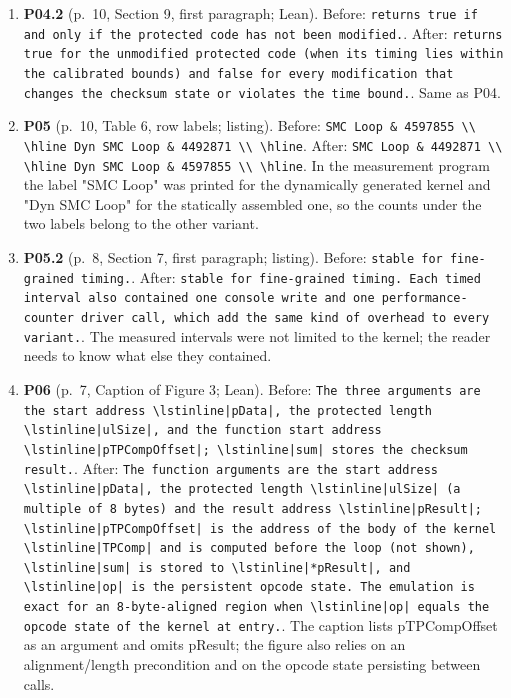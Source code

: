 \documentclass[9pt,twocolumn]{article}
\begin{document}
\begin{enumerate}[label=]
\item \textbf{P04.2} (p.~10, Section 9, first paragraph; Lean). Before: \texttt{returns true if and only if the protected code has not been modified.}. After: \texttt{returns true for the unmodified protected code (when its timing lies within the calibrated bounds) and false for every modification that changes the checksum state or violates the time bound.}. Same as P04. 
\item \textbf{P05} (p.~10, Table 6, row labels; listing). Before: \texttt{SMC Loop \& 4597855 \textbackslash{}\textbackslash{} \textbackslash{}hline Dyn SMC Loop \& 4492871 \textbackslash{}\textbackslash{} \textbackslash{}hline}. After: \texttt{SMC Loop \& 4492871 \textbackslash{}\textbackslash{} \textbackslash{}hline Dyn SMC Loop \& 4597855 \textbackslash{}\textbackslash{} \textbackslash{}hline}. In the measurement program the label "SMC Loop" was printed for the dynamically generated kernel and "Dyn SMC Loop" for the statically assembled one, so the counts under the two labels belong to the other variant. 
\item \textbf{P05.2} (p.~8, Section 7, first paragraph; listing). Before: \texttt{stable for fine-grained timing.}. After: \texttt{stable for fine-grained timing.  Each timed interval also contained one console write and one performance-counter driver call, which add the same kind of overhead to every variant.}. The measured intervals were not limited to the kernel; the reader needs to know what else they contained. 
\item \textbf{P06} (p.~7, Caption of Figure 3; Lean). Before: \texttt{The three arguments are the start address \textbackslash{}lstinline|pData|, the protected length \textbackslash{}lstinline|ulSize|, and the function start address \textbackslash{}lstinline|pTPCompOffset|; \textbackslash{}lstinline|sum| stores the checksum result.}. After: \texttt{The function arguments are the start address \textbackslash{}lstinline|pData|, the protected length \textbackslash{}lstinline|ulSize| (a multiple of 8 bytes) and the result address \textbackslash{}lstinline|pResult|; \textbackslash{}lstinline|pTPCompOffset| is the address of the body of the kernel \textbackslash{}lstinline|TPComp| and is computed before the loop (not shown), \textbackslash{}lstinline|sum| is stored to \textbackslash{}lstinline|*pResult|, and \textbackslash{}lstinline|op| is the persistent opcode state. The emulation is exact for an 8-byte-aligned region when \textbackslash{}lstinline|op| equals the opcode state of the kernel at entry.}. The caption lists pTPCompOffset as an argument and omits pResult; the figure also relies on an alignment/length precondition and on the opcode state persisting between calls. 

\end{enumerate}
\end{document}
